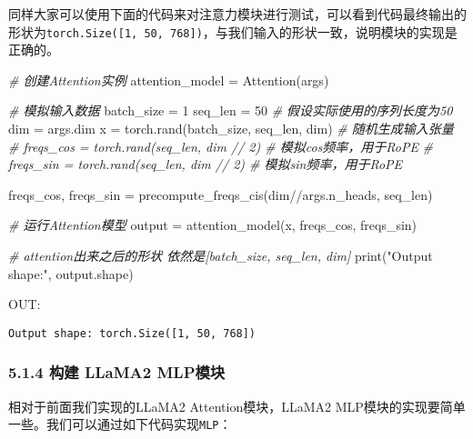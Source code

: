 \documentclass[
]{article}
\newenvironment{Shaded}{}{}
\newcommand{\BuiltInTok}[1]{\textcolor[rgb]{0.00,0.50,0.00}{#1}}
\newcommand{\CommentTok}[1]{\textcolor[rgb]{0.38,0.63,0.69}{\textit{#1}}}
\newcommand{\DecValTok}[1]{\textcolor[rgb]{0.25,0.63,0.44}{#1}}
\newcommand{\NormalTok}[1]{#1}
\newcommand{\OperatorTok}[1]{\textcolor[rgb]{0.40,0.40,0.40}{#1}}
\newcommand{\StringTok}[1]{\textcolor[rgb]{0.25,0.44,0.63}{#1}}
\begin{document}
同样大家可以使用下面的代码来对注意力模块进行测试，可以看到代码最终输出的形状为\texttt{torch.Size({[}1,\ 50,\ 768{]})}，与我们输入的形状一致，说明模块的实现是正确的。

\begin{Shaded}
\begin{Highlighting}[]
\CommentTok{\# 创建Attention实例}
\NormalTok{attention\_model }\OperatorTok{=}\NormalTok{ Attention(args)}

\CommentTok{\# 模拟输入数据}
\NormalTok{batch\_size }\OperatorTok{=} \DecValTok{1}
\NormalTok{seq\_len }\OperatorTok{=} \DecValTok{50}  \CommentTok{\# 假设实际使用的序列长度为50}
\NormalTok{dim }\OperatorTok{=}\NormalTok{ args.dim}
\NormalTok{x }\OperatorTok{=}\NormalTok{ torch.rand(batch\_size, seq\_len, dim)  }\CommentTok{\# 随机生成输入张量}
\CommentTok{\# freqs\_cos = torch.rand(seq\_len, dim // 2)  \# 模拟cos频率，用于RoPE}
\CommentTok{\# freqs\_sin = torch.rand(seq\_len, dim // 2)  \# 模拟sin频率，用于RoPE}

\NormalTok{freqs\_cos, freqs\_sin }\OperatorTok{=}\NormalTok{ precompute\_freqs\_cis(dim}\OperatorTok{//}\NormalTok{args.n\_heads, seq\_len)}

\CommentTok{\# 运行Attention模型}
\NormalTok{output }\OperatorTok{=}\NormalTok{ attention\_model(x, freqs\_cos, freqs\_sin)}

\CommentTok{\# attention出来之后的形状 依然是[batch\_size, seq\_len, dim]}
\BuiltInTok{print}\NormalTok{(}\StringTok{"Output shape:"}\NormalTok{, output.shape)}
\end{Highlighting}
\end{Shaded}

OUT:

\begin{verbatim}
Output shape: torch.Size([1, 50, 768])
\end{verbatim}

\subsubsection{5.1.4 构建 LLaMA2
MLP模块}\label{ux6784ux5efa-llama2-mlpux6a21ux5757}

相对于前面我们实现的LLaMA2 Attention模块，LLaMA2
MLP模块的实现要简单一些。我们可以通过如下代码实现\texttt{MLP}：
\end{document}
